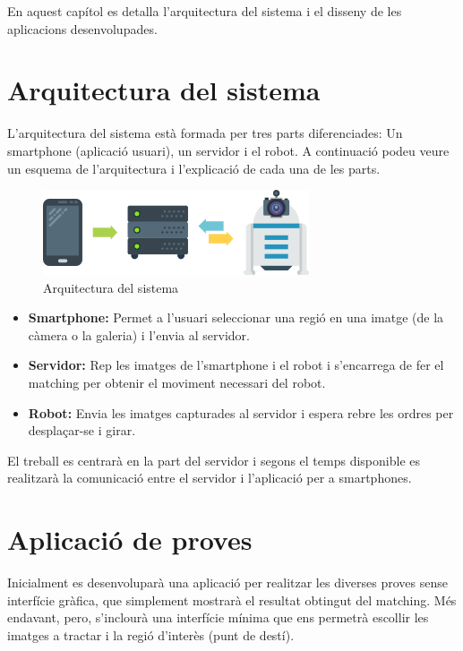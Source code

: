 En aquest capítol es detalla l'arquitectura del sistema i el disseny de les aplicacions desenvolupades.
\section{Arquitectura del sistema}
	L'arquitectura del sistema està formada per tres parts diferenciades: Un smartphone (aplicació usuari), un servidor i el robot. A continuació podeu veure un esquema de l'arquitectura i l'explicació
	de cada una de les parts.\\
	\begin{figure}[H]
		\centering
		\includegraphics[width=0.7\textwidth]{images/arquitectura}
		\caption{Arquitectura del sistema}
	\end{figure}
	\vspace{0.05cm}
	\begin{itemize}
		\item{\textbf{Smartphone:} Permet a l'usuari seleccionar una regió en una imatge (de la càmera o la galeria) i l'envia al servidor.}
		\item{\textbf{Servidor:} Rep les imatges de l'smartphone i el robot i s'encarrega de fer el matching per obtenir el moviment necessari del robot.}
		\item{\textbf{Robot:} Envia les imatges capturades al servidor i espera rebre les ordres per desplaçar-se i girar.\\}
	\end{itemize}
	El treball es centrarà en la part del servidor i segons el temps disponible es realitzarà la comunicació entre el servidor i l'aplicació per a smartphones.

\section{Aplicació de proves}
	Inicialment es desenvoluparà una aplicació per realitzar les diverses proves sense interfície gràfica, que simplement mostrarà el resultat obtingut del matching. Més endavant, pero, s'inclourà una
	interfície mínima que ens permetrà escollir les imatges a tractar i la regió d'interès (punt de destí).
